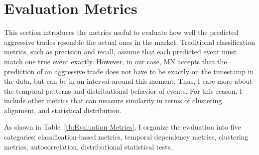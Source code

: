 
\section{Evaluation Metrics} \label{sec:evaluation-metrics}
This section introduces the metrics useful to evaluate how well the predicted aggressive trades resemble the actual ones in the market. Traditional classification metrics, such as precision and recall, assume that each predicted event must match one true event exactly. However, in our case, MN accepts that the prediction of an aggressive trade does not have to be exactly on the timestamp in the data, but can be in an interval around this moment. Thus, I care more about the temporal patterns and distributional behavior of events. For this reason, I include other metrics that can measure similarity in terms of clustering, alignment, and statistical distribution.

As shown in Table~\ref{tb:Evaluation Metrics}, I organize the evaluation into five categories: classification-based metrics, temporal dependency metrics, clustering metrics, autocorrelation, distributional statistical tests.

